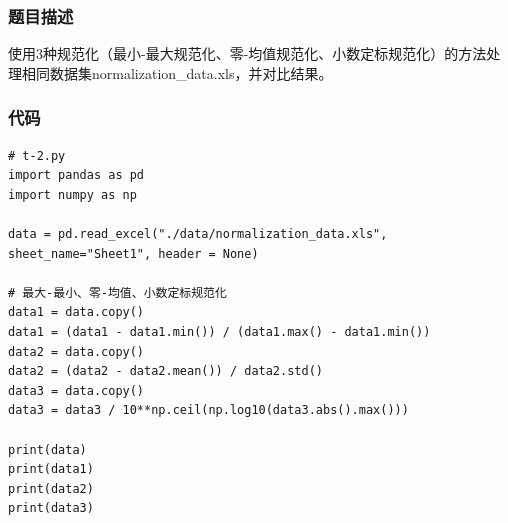 \documentclass{article}
\begin{document}
        \subsubsection{题目描述}
            使用3种规范化（最小-最大规范化、零-均值规范化、小数定标规范化）的方法处理相同数据集normalization\_data.xls，并对比结果。
        \subsubsection{代码}
            \begin{lstlisting}
# t-2.py
import pandas as pd
import numpy as np

data = pd.read_excel("./data/normalization_data.xls", sheet_name="Sheet1", header = None)

# 最大-最小、零-均值、小数定标规范化
data1 = data.copy()
data1 = (data1 - data1.min()) / (data1.max() - data1.min())
data2 = data.copy()
data2 = (data2 - data2.mean()) / data2.std()
data3 = data.copy()
data3 = data3 / 10**np.ceil(np.log10(data3.abs().max()))

print(data)
print(data1)
print(data2)
print(data3)
            \end{lstlisting}
\end{document}
